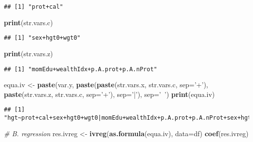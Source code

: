 \documentclass[
]{book}
\newenvironment{Shaded}{\begin{snugshade}}{\end{snugshade}}
\newcommand{\CommentTok}[1]{\textcolor[rgb]{0.56,0.35,0.01}{\textit{#1}}}
\newcommand{\DataTypeTok}[1]{\textcolor[rgb]{0.13,0.29,0.53}{#1}}
\newcommand{\KeywordTok}[1]{\textcolor[rgb]{0.13,0.29,0.53}{\textbf{#1}}}
\newcommand{\NormalTok}[1]{#1}
\newcommand{\StringTok}[1]{\textcolor[rgb]{0.31,0.60,0.02}{#1}}
\begin{document}
\begin{verbatim}
## [1] "prot+cal"
\end{verbatim}

\begin{Shaded}
\begin{Highlighting}[]
\KeywordTok{print}\NormalTok{(str.vars.c)}
\end{Highlighting}
\end{Shaded}

\begin{verbatim}
## [1] "sex+hgt0+wgt0"
\end{verbatim}

\begin{Shaded}
\begin{Highlighting}[]
\KeywordTok{print}\NormalTok{(str.vars.z)}
\end{Highlighting}
\end{Shaded}

\begin{verbatim}
## [1] "momEdu+wealthIdx+p.A.prot+p.A.nProt"
\end{verbatim}

\begin{Shaded}
\begin{Highlighting}[]
\NormalTok{equa.iv <-}\StringTok{ }\KeywordTok{paste}\NormalTok{(var.y,}
                 \KeywordTok{paste}\NormalTok{(}\KeywordTok{paste}\NormalTok{(str.vars.x, str.vars.c, }\DataTypeTok{sep=}\StringTok{'+'}\NormalTok{),}
                       \KeywordTok{paste}\NormalTok{(str.vars.z, str.vars.c, }\DataTypeTok{sep=}\StringTok{'+'}\NormalTok{),}
                       \DataTypeTok{sep=}\StringTok{'|'}\NormalTok{),}
                 \DataTypeTok{sep=}\StringTok{'~'}\NormalTok{)}
\KeywordTok{print}\NormalTok{(equa.iv)}
\end{Highlighting}
\end{Shaded}

\begin{verbatim}
## [1] "hgt~prot+cal+sex+hgt0+wgt0|momEdu+wealthIdx+p.A.prot+p.A.nProt+sex+hgt0+wgt0"
\end{verbatim}

\begin{Shaded}
\begin{Highlighting}[]
\CommentTok{# B. regression}
\NormalTok{res.ivreg <-}\StringTok{ }\KeywordTok{ivreg}\NormalTok{(}\KeywordTok{as.formula}\NormalTok{(equa.iv), }\DataTypeTok{data=}\NormalTok{df)}
\KeywordTok{coef}\NormalTok{(res.ivreg)}
\end{Highlighting}
\end{Shaded}
\end{document}
